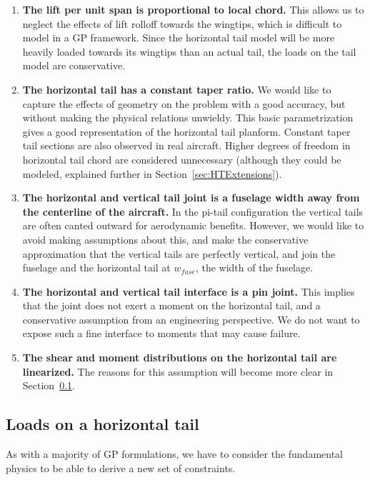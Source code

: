 \begin{enumerate}
    \item \textbf{The lift per unit span is proportional to local chord.} This allows 
    us to neglect the effects of lift rolloff towards the wingtips, which is difficult
    to model in a \gls{GP} framework.  Since the horizontal tail model will 
    be more heavily loaded towards its wingtips than an actual tail, the loads
    on the tail model are conservative. 
    \item \textbf{The horizontal tail has a constant taper ratio.} We would like to 
    capture the effects of geometry on the problem with a good 
    accuracy, but without making the physical relations unwieldy. This basic parametrization
    gives a good representation of the horizontal tail planform.  
    Constant taper tail sections are also observed in real aircraft. 
    Higher degrees of freedom in horizontal tail chord are considered unnecessary 
    (although they could be modeled, explained further in Section~\ref{sec:HTExtensions}). 
    \item \textbf{The horizontal and vertical tail joint is a fuselage width away from 
    the centerline of the aircraft.} In the pi-tail configuration the vertical tails are 
    often canted outward for aerodynamic benefits. However, we would like to avoid making 
    assumptions about this, and make the conservative approximation that the vertical tails
    are perfectly vertical, and join the fuselage and the horizontal tail at $w_{fuse}$, the
    width of the fuselage.
    \item \textbf{The horizontal and vertical tail interface is a pin joint.} This implies 
    that the joint does not exert a moment on the horizontal tail, and a conservative 
    assumption from an engineering perspective. We do not want to expose such a fine 
    interface to moments that may cause failure. \label{item:pinjoint}
    \item \textbf{The shear and moment distributions on the horizontal tail are 
    linearized.} The reasons for this assumption will become more clear in 
    Section~\ref{sec:HTloads}.
\end{enumerate}

\subsection{Loads on a horizontal tail}
\label{sec:HTloads}

As with a majority of \gls{GP} formulations, we have to consider the fundamental physics to 
be able to derive a new set of constraints. 


